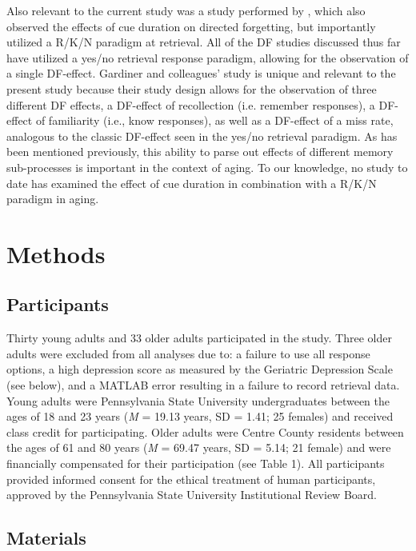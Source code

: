 \documentclass[man]{apa6}
\begin{document}
Also relevant to the current study was a study performed by \textcite{gardiner.gawlik.richardson1994}, which also observed the effects of cue duration on directed forgetting, but importantly utilized a R/K/N paradigm at retrieval. All of the DF studies discussed thus far have utilized a yes/no retrieval response paradigm, allowing for the observation of a single DF-effect. Gardiner and colleagues’ study is unique and relevant to the present study because their study design allows for the observation of three different DF effects, a DF-effect of recollection (i.e. remember responses), a DF-effect of familiarity (i.e., know responses), as well as a DF-effect of a miss rate, analogous to the classic DF-effect seen in the yes/no retrieval paradigm. As has been mentioned previously, this ability to parse out effects of different memory sub-processes is important in the context of aging. To our knowledge, no study to date has examined the effect of cue duration in combination with a R/K/N paradigm in aging.


\section*{Methods}

\subsection*{Participants}

Thirty young adults and 33 older adults participated in the study. Three older adults were excluded from all analyses due to: a failure to use all response options, a high depression score as measured by the Geriatric Depression Scale (see below), and a MATLAB error resulting in a failure to record retrieval data. Young adults were Pennsylvania State University undergraduates between the ages of 18 and 23 years (\textit{M} = 19.13 years, SD = 1.41; 25 females) and received class credit for participating. Older adults were Centre County residents between the ages of 61 and 80 years (\textit{M} = 69.47 years, SD = 5.14; 21 female) and were financially compensated for their participation (see Table 1). All participants provided informed consent for the ethical treatment of human participants, approved by the Pennsylvania State University Institutional Review Board.

\subsection*{Materials}
\end{document}
